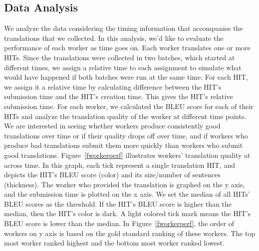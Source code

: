 \documentclass[11pt]{article}
\begin{document}
\subsection{Data Analysis} \label{dataanaly}

We analyze the data considering the timing information that accompanies the translations that we collected. In this analysis, we'd like to evaluate the performance of each worker as time goes on. Each worker translates one or more HITs. Since the translations were collected in two batches, which started at different times, we assign a relative time to each assignment to simulate what would have happened if both batches were run at the same time.  For each HIT, we assign it a relative time by calculating difference between the HIT's submission time and the HIT's creation time. This gives the HIT's relative submission time.  For each worker, we calculated the BLEU score for each of their HITs and analyze the translation quality of the worker at different time points. We are interested in seeing whether workers produce consistently good translations over time or if their quality drops off over time, and if workers who produce bad translations submit them more quickly than workers who submit good translations.  Figure~\ref{fworkerperf} illustrates workers' translation quality at across time. In this graph, each tick represent a single translation HIT, and depicts the HIT's BLEU score (color) and its size/number of sentences (thickness).  The worker who provided the translation is graphed on the y axis, and the submission time is plotted on the x axis. We set the median of all HITs' BLEU scores as the threshold. If the HIT's BLEU score is higher than the median, then the HIT's color is dark.  A light colored tick mark means the HIT's BLEU score is lower than the median. In Figure~\ref{fworkerperf}, the order of workers on y axis is based on the gold standard ranking of these workers. The top most worker ranked highest and the bottom most worker ranked lowest. 
\end{document}
